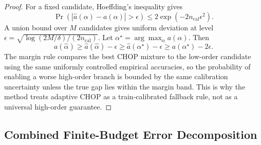 \begin{proof}
For a fixed candidate, Hoeffding's inequality gives
\begin{equation}
    \Pr(|\hat a(\alpha)-a(\alpha)|>\epsilon)\le2\exp(-2n_{\mathrm{cal}}\epsilon^2).
\end{equation}
A union bound over \(M\) candidates gives uniform deviation at level
\(\epsilon=\sqrt{\log(2M/\delta)/(2n_{\mathrm{cal}})}\). Let \(\alpha^\star=\arg\max_{\alpha}a(\alpha)\). Then
\begin{equation}
    a(\hat\alpha)\ge \hat a(\hat\alpha)-\epsilon
    \ge \hat a(\alpha^\star)-\epsilon
    \ge a(\alpha^\star)-2\epsilon.
\end{equation}
The margin rule compares the best CHOP mixture to the low-order candidate using the same uniformly controlled empirical accuracies, so the probability of enabling a worse high-order branch is bounded by the same calibration uncertainty unless the true gap lies within the margin band. This is why the method treats adaptive CHOP as a train-calibrated fallback rule, not as a universal high-order guarantee.
\end{proof}

\subsection{Combined Finite-Budget Error Decomposition}

